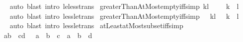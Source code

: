 \begin{isabellebody}
%
\isadelimproof
\ \ %
\endisadelimproof
%
\isatagproof
{}\isamarkupfalse%
\ auto\ {\isacharparenleft}{\kern0pt}blast\ intro{\isacharcolon}{\kern0pt}\ le{\isacharunderscore}{\kern0pt}less{\isacharunderscore}{\kern0pt}trans{\isacharparenright}{\kern0pt}%
\endisatagproof
{\isafoldproof}%
%
\isadelimproof
\isanewline
%
\endisadelimproof
\isanewline
{}\isamarkupfalse%
\ greaterThanAtMost{\isacharunderscore}{\kern0pt}empty{\isacharunderscore}{\kern0pt}iff{\isacharbrackleft}{\kern0pt}simp{\isacharbrackright}{\kern0pt}{\isacharcolon}{\kern0pt}\ {\isachardoublequoteopen}{\isacharbraceleft}{\kern0pt}k{\isacharless}{\kern0pt}{\isachardot}{\kern0pt}{\isachardot}{\kern0pt}l{\isacharbraceright}{\kern0pt}\ {\isacharequal}{\kern0pt}\ {\isacharbraceleft}{\kern0pt}{\isacharbraceright}{\kern0pt}\ {\isasymlongleftrightarrow}\ {\isasymnot}\ k\ {\isacharless}{\kern0pt}\ l{\isachardoublequoteclose}\isanewline
%
\isadelimproof
\ \ %
\endisadelimproof
%
\isatagproof
{}\isamarkupfalse%
\ auto\ {\isacharparenleft}{\kern0pt}blast\ intro{\isacharcolon}{\kern0pt}\ less{\isacharunderscore}{\kern0pt}le{\isacharunderscore}{\kern0pt}trans{\isacharparenright}{\kern0pt}%
\endisatagproof
{\isafoldproof}%
%
\isadelimproof
\isanewline
%
\endisadelimproof
\isanewline
{}\isamarkupfalse%
\ greaterThanAtMost{\isacharunderscore}{\kern0pt}empty{\isacharunderscore}{\kern0pt}iff{}{\isacharbrackleft}{\kern0pt}simp{\isacharbrackright}{\kern0pt}{\isacharcolon}{\kern0pt}\ {\isachardoublequoteopen}{\isacharbraceleft}{\kern0pt}{\isacharbraceright}{\kern0pt}\ {\isacharequal}{\kern0pt}\ {\isacharbraceleft}{\kern0pt}k{\isacharless}{\kern0pt}{\isachardot}{\kern0pt}{\isachardot}{\kern0pt}l{\isacharbraceright}{\kern0pt}\ {\isasymlongleftrightarrow}\ {\isasymnot}\ k\ {\isacharless}{\kern0pt}\ l{\isachardoublequoteclose}\isanewline
%
\isadelimproof
\ \ %
\endisadelimproof
%
\isatagproof
{}\isamarkupfalse%
\ auto\ {\isacharparenleft}{\kern0pt}blast\ intro{\isacharcolon}{\kern0pt}\ less{\isacharunderscore}{\kern0pt}le{\isacharunderscore}{\kern0pt}trans{\isacharparenright}{\kern0pt}%
\endisatagproof
{\isafoldproof}%
%
\isadelimproof
\isanewline
%
\endisadelimproof
\isanewline
{}\isamarkupfalse%
\ atLeastatMost{\isacharunderscore}{\kern0pt}subset{\isacharunderscore}{\kern0pt}iff{\isacharbrackleft}{\kern0pt}simp{\isacharbrackright}{\kern0pt}{\isacharcolon}{\kern0pt}\isanewline
\ \ {\isachardoublequoteopen}{\isacharbraceleft}{\kern0pt}a{\isachardot}{\kern0pt}{\isachardot}{\kern0pt}b{\isacharbraceright}{\kern0pt}\ {\isasymle}\ {\isacharbraceleft}{\kern0pt}c{\isachardot}{\kern0pt}{\isachardot}{\kern0pt}d{\isacharbraceright}{\kern0pt}\ {\isasymlongleftrightarrow}\ {\isacharparenleft}{\kern0pt}{\isasymnot}\ a\ {\isasymle}\ b{\isacharparenright}{\kern0pt}\ {\isasymor}\ c\ {\isasymle}\ a\ {\isasymand}\ b\ {\isasymle}\ d{\isachardoublequoteclose}\isanewline

\end{isabellebody}
